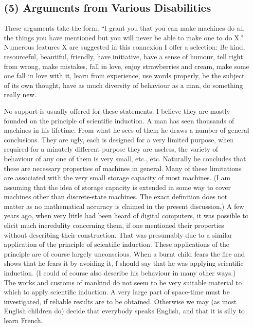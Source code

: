 \documentclass[10pt,twoside,openright]{memoir}
\begin{document}
\subsection{(5) Arguments from Various Disabilities}

These arguments take the form, ``I grant you that you can make machines do all the things you have mentioned but you will never be able to make one to do X.'' Numerous features X are suggested in this connexion I offer a selection:
Be kind, resourceful, beautiful, friendly, have initiative, have a sense of humour, tell right from wrong, make mistakes, fall in love, enjoy strawberries and cream, make some one fall in love with it, learn from experience, use words properly, be the subject of its own thought, have as much diversity of behaviour as a man, do something really new.

No support is usually offered for these statements. I believe they are mostly founded on the principle of scientific induction. A man has seen thousands of machines in his lifetime. From what he sees of them he draws a number of general conclusions. They are ugly, each is designed for a very limited purpose, when required for a minutely different purpose they are useless, the variety of behaviour of any one of them is very small, etc., etc. Naturally he concludes that these are necessary properties of machines in general. Many of these limitations are associated with the very small storage capacity of most machines. (I am assuming that the idea of storage capacity is extended in some way to
cover machines other than discrete-state machines. The exact definition does not matter as no mathematical accuracy is claimed in the present discussion,) A few years ago, when very little had been heard of digital computers, it was possible to elicit much incredulity concerning them, if one mentioned their properties without describing their construction. That was presumably due to a similar application of the principle of scientific induction. These applications of the principle are of course largely unconscious. When a burnt child fears the fire and shows that he fears it by avoiding it, f should say that he was applying scientific induction. (I could of course also describe his behaviour in many other ways.) The works and customs of mankind do not seem to be very suitable material to which to apply scientific induction. A very large part of space-time must be investigated, if reliable results are to be obtained. Otherwise we may (as most English children do) decide that everybody speaks English, and that it is silly to learn French.
\end{document}
